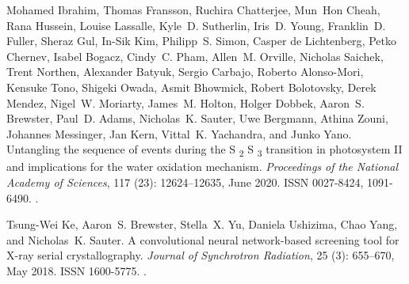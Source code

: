 \documentclass[a4paper]{article}
\begin{document}
\begin{thebibliography}{33}
Mohamed Ibrahim, Thomas Fransson, Ruchira Chatterjee, Mun~Hon Cheah, Rana
  Hussein, Louise Lassalle, Kyle~D. Sutherlin, Iris~D. Young, Franklin~D.
  Fuller, Sheraz Gul, In-Sik Kim, Philipp~S. Simon, Casper {de Lichtenberg},
  Petko Chernev, Isabel Bogacz, Cindy~C. Pham, Allen~M. Orville, Nicholas
  Saichek, Trent Northen, Alexander Batyuk, Sergio Carbajo, Roberto
  {Alonso-Mori}, Kensuke Tono, Shigeki Owada, Asmit Bhowmick, Robert
  Bolotovsky, Derek Mendez, Nigel~W. Moriarty, James~M. Holton, Holger Dobbek,
  Aaron~S. Brewster, Paul~D. Adams, Nicholas~K. Sauter, Uwe Bergmann, Athina
  Zouni, Johannes Messinger, Jan Kern, Vittal~K. Yachandra, and Junko Yano.
\newblock Untangling the sequence of events during the {{S}}
  {\textsubscript{2}} \textrightarrow{} {{S}} {\textsubscript{3}} transition in
  photosystem {{II}} and implications for the water oxidation mechanism.
\newblock \emph{Proceedings of the National Academy of Sciences}, 117
  (23): 12624--12635, June 2020.
\newblock ISSN 0027-8424, 1091-6490.
\newblock {}.

Tsung-Wei Ke, Aaron~S. Brewster, Stella~X. Yu, Daniela Ushizima, Chao Yang, and
  Nicholas~K. Sauter.
\newblock A convolutional neural network-based screening tool for {{X-ray}}
  serial crystallography.
\newblock \emph{Journal of Synchrotron Radiation}, 25 (3):
  655--670, May 2018.
\newblock ISSN 1600-5775.
\newblock {}.


\end{thebibliography}
\end{document}
